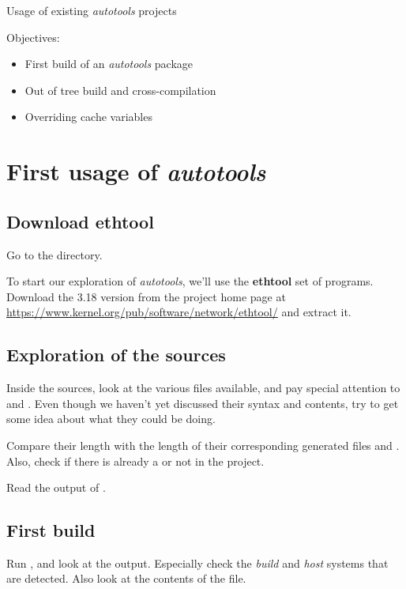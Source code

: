\subchapter
{Usage of existing {\em autotools} projects}
{Objectives:
  \begin{itemize}
  \item First build of an {\em autotools} package
  \item Out of tree build and cross-compilation
  \item Overriding cache variables
  \end{itemize}
}

\section{First usage of {\em autotools}}

\subsection{Download ethtool}

Go to the  directory.

To start our exploration of {\em autotools}, we'll use the {\bf
  ethtool} set of programs. Download the 3.18 version from the project
home page at
\url{https://www.kernel.org/pub/software/network/ethtool/} and extract
it.

\subsection{Exploration of the sources}

Inside the sources, look at the various files available, and pay
special attention to  and . Even
though we haven't yet discussed their syntax and contents, try to get
some idea about what they could be doing.

Compare their length with the length of their corresponding generated
files  and . Also, check if there is
already a  or not in the project.

Read the output of .

\subsection{First build}

Run , and look at the output. Especially check the
{\em build} and {\em host} systems that are detected. Also look at the
contents of the  file.

